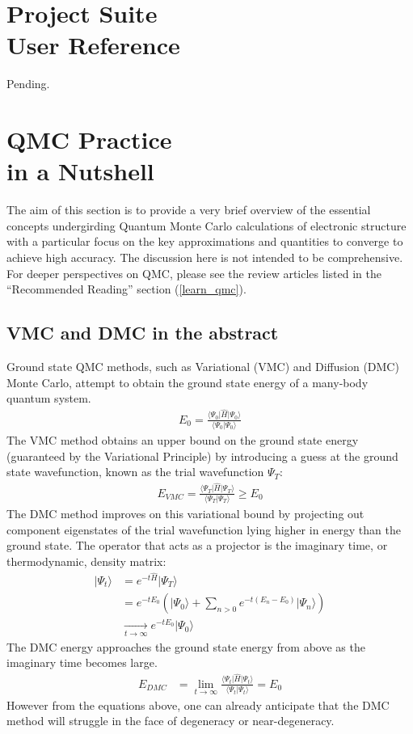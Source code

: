 \documentclass[oneside,11pt]{memoir}
\numberwithin{equation}{section}
\newcommand{\ket}[1]{\lvert #1 \rangle}
\newcommand{\bra}[1]{\langle #1 \rvert}
\newcommand{\expval}[3]{\bra{#1}\hat{#2}\ket{#3}}
\newcommand{\overlap}[2]{\langle #1 \lvert #2 \rangle}
\begin{document}
\pagebreak
\chapter{Project Suite \\User Reference} \label{reference}
Pending.



\pagebreak
\chapter{QMC Practice \\in a Nutshell}\label{theory}
The aim of this section is to provide a very brief overview of the 
essential concepts undergirding Quantum Monte Carlo calculations 
of electronic structure with a particular focus on the key 
approximations and quantities to converge to achieve high
accuracy.  The discussion here is not intended to be comprehensive. 
For deeper perspectives on QMC, please see the review articles 
listed in the ``Recommended Reading'' section (\ref{learn_qmc}).


\section{VMC and DMC in the abstract}
Ground state QMC methods, such as Variational (VMC) and Diffusion (DMC) Monte 
Carlo, attempt to obtain the ground state energy of a many-body quantum system.
\begin{align}
  E_0 = \frac{\expval{\Psi_0}{H}{\Psi_0}}{\overlap{\Psi_0}{\Psi_0}}
\end{align}
The VMC method obtains an upper bound on the ground state energy (guaranteed 
by the Variational Principle) by introducing a guess at the ground state wavefunction, known as the trial wavefunction $\Psi_T$:
\begin{align}
  E_{VMC} = \frac{\expval{\Psi_T}{H}{\Psi_T}}{\overlap{\Psi_T}{\Psi_T}} \ge E_0
\end{align}
The DMC method improves on this variational bound by projecting out component 
eigenstates of the trial wavefunction lying higher in energy than the ground 
state.  The operator that acts as a projector is the imaginary time, or 
thermodynamic, density matrix:
\begin{align}
  \ket{\Psi_t} & = e^{-t\hat{H}}\ket{\Psi_T} \nonumber \\
               & = e^{-tE_0}\left( \ket{\Psi_0} + \sum_{n>0}e^{-t(E_n-E_0)}\ket{\Psi_n} \right) \nonumber \\
               &\xrightarrow[t\rightarrow\infty]{} e^{-tE_0} \ket{\Psi_0} 
\end{align}
The DMC energy approaches the ground state energy from above as the imaginary 
time becomes large. 
\begin{align}
  E_{DMC}  & = \lim_{t\rightarrow\infty}\frac{\expval{\Psi_t}{H}{\Psi_t}}{\overlap{\Psi_t}{\Psi_t}} = E_0
\end{align}
However from the equations above, one can already anticipate that the DMC 
method will struggle in the face of degeneracy or near-degeneracy.
\end{document}
